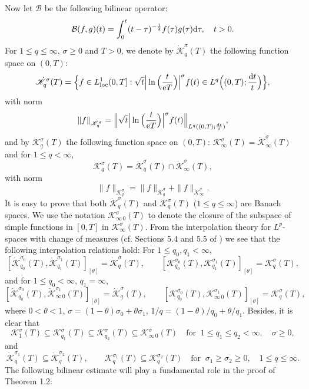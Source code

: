 \documentclass[11pt]{article}
\newcommand{\rmd}{\mbox{\rm d}}
\newcommand{\rme}{{\rm e}}
\begin{document}
  Now let $\mathcal{B}$ be the following bilinear operator:
$$
  \mathcal{B}(f,g)(t)=\int_0^t(t-\tau)^{-\frac{1}{2}}f(\tau)g(\tau)\rmd\tau, \quad t>0.
$$
  For $1\leqslant q\leqslant\infty$, $\sigma\geqslant 0$ and $T>0$, we denote by $\dot{\mathscr{K}}^{\sigma}_q(T)$ the following function space on
  $(0,T)$:
$$
  \dot{\mathscr{K}}^{\sigma}_q(T)=\Big\{f\in L^1_{\rm loc}(0,T]:\sqrt{t}\Big|\ln\Big(\frac{t}{\rme T}\Big)\Big|^{\sigma}f(t)\in
  L^q\Big((0,T);\frac{\rmd t}{t}\Big)\Big\},
$$
  with norm
$$
  \|f\|_{\dot{\mathscr{K}}^{\sigma}_q}=\Big\|\sqrt{t}\Big|\ln\Big(\frac{t}{\rme T}\Big)\Big|^{\sigma}f(t)\Big\|_{L^q((0,T);\frac{dt}{t})},
$$
  and by $\mathscr{K}^{\sigma}_q(T)$ the following function space on $(0,T)$: $\mathscr{K}^{\sigma}_{\infty}(T)=\dot{\mathscr{K}}^{\sigma}_{\infty}(T)$
  and for $1\leqslant q<\infty$,
$$
  \mathscr{K}^{\sigma}_q(T)=\dot{\mathscr{K}}^{\sigma}_q(T)\cap\dot{\mathscr{K}}^{\sigma}_{\infty}(T),
$$
  with norm
$$
  \|f\|_{\mathscr{K}^{\sigma}_q}=\|f\|_{\dot{\mathscr{K}}^{\sigma}_q}+\|f\|_{\dot{\mathscr{K}}^{\sigma}_{\infty}}.
$$
  It is easy to prove that both $\dot{\mathscr{K}}^{\sigma}_q(T)$ and $\mathscr{K}^{\sigma}_q(T)$ ($1\leqslant q\leqslant\infty$) are Banach spaces.
  We use the notation $\mathscr{K}^{\sigma}_{\infty\,0}(T)$ to denote the closure of the subspace of simple functions in $[0,T]$ in
  $\mathscr{K}^{\sigma}_{\infty}(T)$. From the interpolation theory for $L^p$-spaces with change of measures (cf. Sections 5.4 and 5.5 of
  \cite{BerLof}) we see that the following interpolation relations hold: For $1\leqslant q_0,q_1<\infty$,
$$
  [\dot{\mathscr{K}}^{\sigma_0}_{q_0}(T),\dot{\mathscr{K}}^{\sigma_1}_{q_1}(T)]_{[\theta]}=\dot{\mathscr{K}}^{\sigma}_q(T), \qquad
  [\mathscr{K}^{\sigma_0}_{q_0}(T),\mathscr{K}^{\sigma_1}_{q_1}(T)]_{[\theta]}=\mathscr{K}^{\sigma}_q(T),
$$
  and for $1\leqslant q_0<\infty$, $q_1=\infty$,
$$
  [\dot{\mathscr{K}}^{\sigma_0}_{q_0}(T),\dot{\mathscr{K}}^{\sigma_1}_{\infty\,0}(T)]_{[\theta]}=\dot{\mathscr{K}}^{\sigma}_q(T), \qquad
  [\mathscr{K}^{\sigma_0}_{q_0}(T),\mathscr{K}^{\sigma_1}_{\infty\,0}(T)]_{[\theta]}=\mathscr{K}^{\sigma}_q(T),
$$
  where $0<\theta<1$, $\sigma=(1\!-\!\theta)\sigma_0+\theta\sigma_1$, $1/q=(1\!-\!\theta)/q_0+\theta/q_1$. Besides, it is clear that
$$
  \mathscr{K}^{\sigma}_{1}(T)\subseteq\mathscr{K}^{\sigma}_{q_1}(T)\subseteq\mathscr{K}^{\sigma}_{q_2}(T)\subseteq\mathscr{K}^{\sigma}_{\infty\,0}(T)
  \quad \mbox{for}\;\; 1\leqslant q_1\leqslant q_2<\infty, \quad \sigma\geqslant 0,
$$
  and
$$
  \dot{\mathscr{K}}^{\sigma_1}_q(T)\subseteq\dot{\mathscr{K}}^{\sigma_2}_q(T), \qquad
  \mathscr{K}^{\sigma_1}_q(T)\subseteq\mathscr{K}^{\sigma_2}_q(T)
  \quad \mbox{for}\;\; \sigma_1\geqslant\sigma_2\geqslant 0, \quad 1\leqslant q\leqslant\infty.
$$
  The following bilinear estimate will play a fundamental role in the proof of Theorem 1.2:
\medskip
\end{document}
